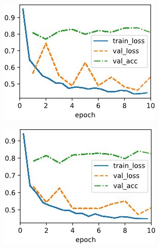 \documentclass{article}
\begin{document}
\begin{figure}[ht]
\begin{center}
\begin{subfigure}[b]{0.3\columnwidth}
\includegraphics[width=\columnwidth]{img/lr0.2 cosine0.1.jpg}
\end{subfigure}
\hfill
\begin{subfigure}[b]{0.3\columnwidth}\centering
\includegraphics[width=\columnwidth]{img/lr0.2 cosine0.05.jpg}
\end{subfigure}
\hfill
\begin{subfigure}[b]{0.3\columnwidth}\centering

\end{subfigure}
\end{center}
\end{figure}
\end{document}
